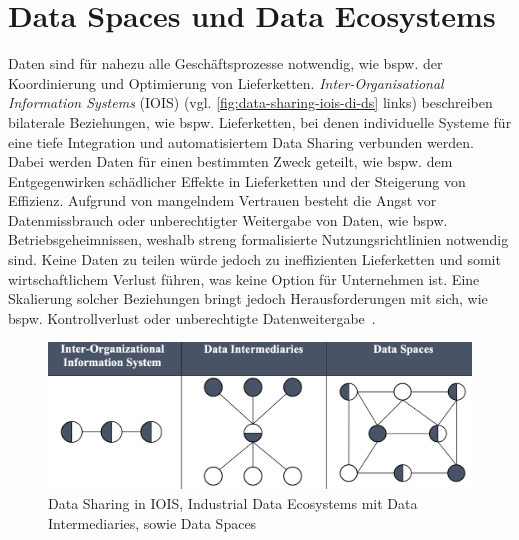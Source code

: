 
\section{Data Spaces und Data Ecosystems}

Daten sind für nahezu alle Geschäftsprozesse notwendig, wie bspw. der Koordinierung und Optimierung von Lieferketten.
\emph{Inter-Organisational Information Systems} (IOIS) (vgl. \autoref{fig:data-sharing-iois-di-ds} links) beschreiben bilaterale Beziehungen, wie bspw. Lieferketten, bei denen individuelle Systeme für eine tiefe Integration und automatisiertem Data Sharing verbunden werden.
Dabei werden Daten für einen bestimmten Zweck geteilt, wie bspw. dem Entgegenwirken schädlicher Effekte in Lieferketten und der Steigerung von Effizienz.
Aufgrund von mangelndem Vertrauen besteht die Angst vor Datenmissbrauch oder unberechtigter Weitergabe von Daten, wie bspw. Betriebsgeheimnissen, weshalb streng formalisierte Nutzungsrichtlinien notwendig sind.
Keine Daten zu teilen würde jedoch zu ineffizienten Lieferketten und somit wirtschaftlichem Verlust führen, was keine Option für Unternehmen ist.
Eine Skalierung solcher Beziehungen bringt jedoch Herausforderungen mit sich, wie bspw. Kontrollverlust oder unberechtigte Datenweitergabe~\cite{mollerIndustrialDataEcosystems2024}.

\begin{figure}
    \includegraphics[width=\textwidth]{./assets/moller_iois_di_ds.png}
    \caption{Data Sharing in IOIS, Industrial Data Ecosystems mit Data Intermediaries, sowie Data Spaces~\cite{mollerIndustrialDataEcosystems2024}}
    \label{fig:data-sharing-iois-di-ds}
\end{figure}

